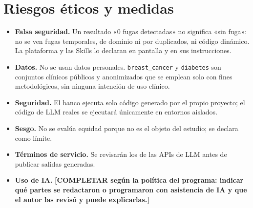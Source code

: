 \section{Riesgos éticos y medidas}

\begin{itemize}
  \item \textbf{Falsa seguridad.} Un resultado «0 fugas detectadas» no significa «sin fuga»: no se ven fugas temporales, de dominio ni por duplicados, ni código dinámico. La plataforma y las Skills lo declaran en pantalla y en sus instrucciones.
  \item \textbf{Datos.} No se usan datos personales. \texttt{breast\_cancer} y \texttt{diabetes} son conjuntos clínicos públicos y anonimizados que se emplean solo con fines metodológicos, sin ninguna intención de uso clínico.
  \item \textbf{Seguridad.} El banco ejecuta solo código generado por el propio proyecto; el código de LLM reales se ejecutará únicamente en entornos aislados.
  \item \textbf{Sesgo.} No se evalúa equidad porque no es el objeto del estudio; se declara como límite.
  \item \textbf{Términos de servicio.} Se revisarán los de las APIs de LLM antes de publicar salidas generadas.
  \item \textbf{Uso de IA.} \textbf{[COMPLETAR según la política del programa: indicar qué partes se redactaron o programaron con asistencia de IA y que el autor las revisó y puede explicarlas.]}
\end{itemize}
